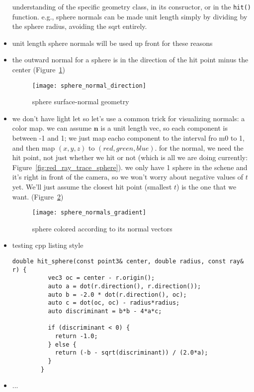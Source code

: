 \begin{itemize}
        understanding of the specific geometry class, in its consructor, or in
        the \texttt{hit()} function. e.g., sphere normals can be made unit
        length simply by dividing by the sphere radius, avoiding the sqrt
        entirely.
    \item unit length sphere normals will be used up front for these reasons
    \item the outward normal for a sphere is in the direction of the hit point
        minus the center (Figure~\ref{fig:sphere_normal_direction})
        \begin{figure}[ht]
            \centering
            \texttt{[image: sphere\_normal\_direction]}
            \captionsetup{labelfont=bf, textfont=it}
            \caption{sphere surface-normal geometry}
            \label{fig:sphere_normal_direction}
        \end{figure}
        
        \clearpage
    \item we don't have light let so let's use a common trick for visualizing
        normals: a color map. we can assume $\mathbf{n}$ is a unit length vec,
        so each component is between -1 and 1; we just map eacho component to
        the interval fro m0 to 1, and then map $(x,y,z)$ to $(red,green,blue)$.
        for the normal, we need the hit point, not just whether we hit or not
        (which is all we are doing currently:
        Figure~\ref{fig:red_ray_trace_sphere}). we only have 1 sphere in the
        schene and it's right in front of the camera, so we won't worry about
        negative values of $t$ yet. We'll just assume the closest hit point
        (smallest $t$) is the one that we want.
        (Figure~\ref{fig:sphere_normals_gradient})
        \begin{figure}[ht]
            \centering
            \texttt{[image: sphere\_normals\_gradient]}
            \captionsetup{labelfont=bf, textfont=it}
            \caption{sphere colored according to its normal vectors}
            \label{fig:sphere_normals_gradient}
        \end{figure}
        \clearpage
    \item testing cpp listing style
        \begin{lstlisting}[style=rosepinestyle]
        double hit_sphere(const point3& center, double radius, const ray& r) {
          vec3 oc = center - r.origin();
          auto a = dot(r.direction(), r.direction());
          auto b = -2.0 * dot(r.direction(), oc);
          auto c = dot(oc, oc) - radius*radius;
          auto discriminant = b*b - 4*a*c;
          
          if (discriminant < 0) {
            return -1.0;
          } else {
            return (-b - sqrt(discriminant)) / (2.0*a);
          }
        }
        \end{lstlisting}
    \item ...
\end{itemize}
